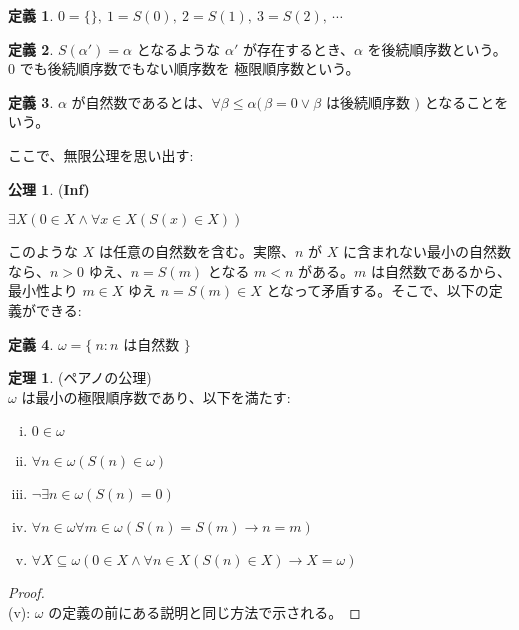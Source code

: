 \documentclass{jsarticle}
\theoremstyle{definition}
\newtheorem*{axiom*}{公理}
\newtheorem*{definition*}{定義}
\newtheorem{theorem}{定理}[section]
\begin{document}
    \begin{definition*} \label{zero_one_} $0 = \{\}, \ 1 = S(0), \ 2 = S(1), \ 3 = S(2),\  \cdots$
    \end{definition*}
    \begin{definition*} \label{limit_ordinal} $S(\alpha') = \alpha$ となるような $\alpha'$ が存在するとき、$\alpha$ を後続順序数という。$0$ でも後続順序数でもない順序数を 極限順序数という。
    \end{definition*}
    \begin{definition*} \label{natural_number} $\alpha$ が自然数であるとは、$\forall \beta \leq \alpha (\,\beta = 0 \lor \beta$ は後続順序数 $)$ となることをいう。
    \end{definition*}
    
    ここで、無限公理を思い出す:
    \begin{axiom*} (\bf Inf)
        \begin{center}
            $\exists X (0 \in X \land \forall x \in X(S(x) \in X))$
        \end{center}
    \end{axiom*}
    
    このような $X$ は任意の自然数を含む。実際、$n$ が $X$ に含まれない最小の自然数なら、$n > 0$ ゆえ、$n = S(m)$ となる $m < n$ がある。$m$ は自然数であるから、最小性より $m \in X$ ゆえ $n = S(m) \in X$ となって矛盾する。そこで、以下の定義ができる:
    
    \begin{definition*} \label{omega} $\omega = \{\ n : n$ は自然数 $\}$
    \end{definition*}
    
    \begin{theorem} \label{Peano_axioms} (ペアノの公理) \\
        $\omega$ は最小の極限順序数であり、以下を満たす:
        \begin{enumerate}[(i)]
            \item $0 \in \omega$
            \item $\forall n \in \omega (S(n) \in \omega)$
            \item $\lnot\exists n \in \omega (S(n) = 0)$
            \item $\forall n \in \omega \forall m \in \omega (S(n) = S(m) \rightarrow n = m)$
            \item $\forall X \subseteq \omega (0 \in X \land \forall n \in X (S(n) \in X) \rightarrow X = \omega)$
        \end{enumerate}
    \end{theorem}
    \begin{proof} \ \\
    (v): $\omega$ の定義の前にある説明と同じ方法で示される。
    \end{proof}
    \newpage
    
\end{document}
